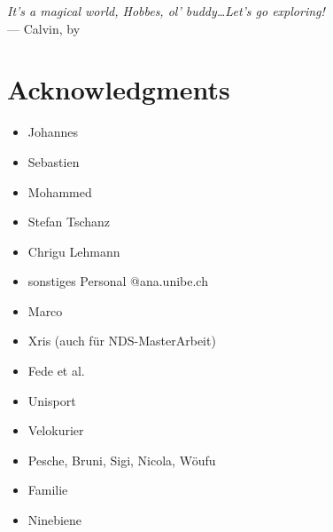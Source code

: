 
\begin{flushright}{\slshape    
		It's a magical world, Hobbes, ol' buddy\dots Let's go exploring!} \\ \medskip
    --- Calvin, by \citep{Watterson1996}
\end{flushright}

\bigskip
\begingroup
\let\clearpage\relax
\let\cleardoublepage\relax
\let\cleardoublepage\relax
\chapter*{Acknowledgments}
\begin{itemize}
	\item Johannes
	\item Sebastien
	\item Mohammed
	\item Stefan Tschanz
	\item Chrigu Lehmann
	\item sonstiges Personal @ana.unibe.ch
\end{itemize}
\bigskip
\begin{itemize}
	\item Marco
	\item Xris (auch für NDS-MasterArbeit)
	\item Fede et al.
\end{itemize}
\bigskip
\begin{itemize}
	\item Unisport
	\item Velokurier
\end{itemize}
\bigskip
\begin{itemize}
	\item Pesche, Bruni, Sigi, Nicola, Wöufu
	\item Familie
	\item Ninebiene
\end{itemize}

\endgroup